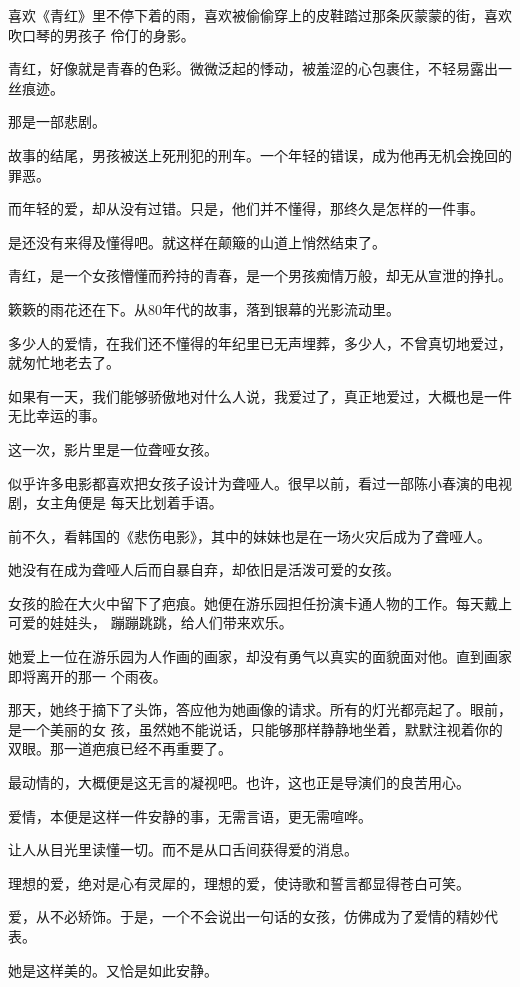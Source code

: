 		喜欢《青红》里不停下着的雨，喜欢被偷偷穿上的皮鞋踏过那条灰蒙蒙的街，喜欢吹口琴的男孩子
	伶仃的身影。

		青红，好像就是青春的色彩。微微泛起的悸动，被羞涩的心包裹住，不轻易露出一丝痕迹。

		那是一部悲剧。\par
		故事的结尾，男孩被送上死刑犯的刑车。一个年轻的错误，成为他再无机会挽回的罪恶。\par
		而年轻的爱，却从没有过错。只是，他们并不懂得，那终久是怎样的一件事。\par
		是还没有来得及懂得吧。就这样在颠簸的山道上悄然结束了。\par
		青红，是一个女孩懵懂而矜持的青春，是一个男孩痴情万般，却无从宣泄的挣扎。

		簌簌的雨花还在下。从80年代的故事，落到银幕的光影流动里。

		多少人的爱情，在我们还不懂得的年纪里已无声埋葬，多少人，不曾真切地爱过，就匆忙地老去了。

		如果有一天，我们能够骄傲地对什么人说，我爱过了，真正地爱过，大概也是一件无比幸运的事。

		这一次，影片里是一位聋哑女孩。

		似乎许多电影都喜欢把女孩子设计为聋哑人。很早以前，看过一部陈小春演的电视剧，女主角便是
	每天比划着手语。

		前不久，看韩国的《悲伤电影》，其中的妹妹也是在一场火灾后成为了聋哑人。

		她没有在成为聋哑人后而自暴自弃，却依旧是活泼可爱的女孩。

		女孩的脸在大火中留下了疤痕。她便在游乐园担任扮演卡通人物的工作。每天戴上可爱的娃娃头，
	蹦蹦跳跳，给人们带来欢乐。

		她爱上一位在游乐园为人作画的画家，却没有勇气以真实的面貌面对他。直到画家即将离开的那一
	个雨夜。

		那天，她终于摘下了头饰，答应他为她画像的请求。所有的灯光都亮起了。眼前，是一个美丽的女
	孩，虽然她不能说话，只能够那样静静地坐着，默默注视着你的双眼。那一道疤痕已经不再重要了。

		最动情的，大概便是这无言的凝视吧。也许，这也正是导演们的良苦用心。

		爱情，本便是这样一件安静的事，无需言语，更无需喧哗。\par
		让人从目光里读懂一切。而不是从口舌间获得爱的消息。\par
		理想的爱，绝对是心有灵犀的，理想的爱，使诗歌和誓言都显得苍白可笑。\par
		爱，从不必矫饰。于是，一个不会说出一句话的女孩，仿佛成为了爱情的精妙代表。\par
		她是这样美的。又恰是如此安静。

